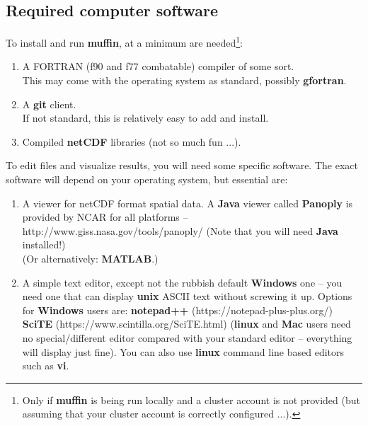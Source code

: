 \documentclass[11pt,fleqn]{book} %
\begin{document}

\subsection*{Required computer software}

To install and run \textbf{muffin}, at a minimum are needed\footnote{Only if \textbf{muffin} is being run locally and a cluster account is not provided (but assuming that your cluster account is correctly configured ...).}:

\begin{enumerate}[noitemsep]
\setlength{\itemindent}{.2in}
\item A FORTRAN (f90 and f77 combatable) compiler of some sort.
\\This may come with the operating system as standard, possibly \textbf{gfortran}.
\item A \textbf{git} client.
\\If not standard, this is relatively easy to add and install.
\item Compiled \textbf{netCDF} libraries (not so much fun ...).
\end{enumerate}

To edit files and visualize results, you will need some specific software. The exact software will depend on your operating system, but essential are:

\begin{enumerate}[noitemsep]
\setlength{\itemindent}{.2in}
\item A viewer for netCDF format spatial data. A \textbf{Java} viewer called \textbf{Panoply} is provided by NCAR for all platforms – http://www.giss.nasa.gov/tools/panoply/
(Note that you will need \textbf{Java} installed!)
\\(Or alternatively: \textbf{MATLAB}.)
\item  A simple text editor, except not the rubbish default \textbf{Windows} one – you need one that can display \textbf{unix} ASCII text without screwing it up. Options for \textbf{Windows} users are:
\textbf{notepad++} (https://notepad-plus-plus.org/)
\textbf{SciTE} (https://www.scintilla.org/SciTE.html)
(\textbf{linux} and \textbf{Mac} users need no special/different editor compared with your standard editor – everything will display just fine). You can also use \textbf{linux} command line based editors such as \textbf{vi}.
\end{enumerate}
\end{document}
